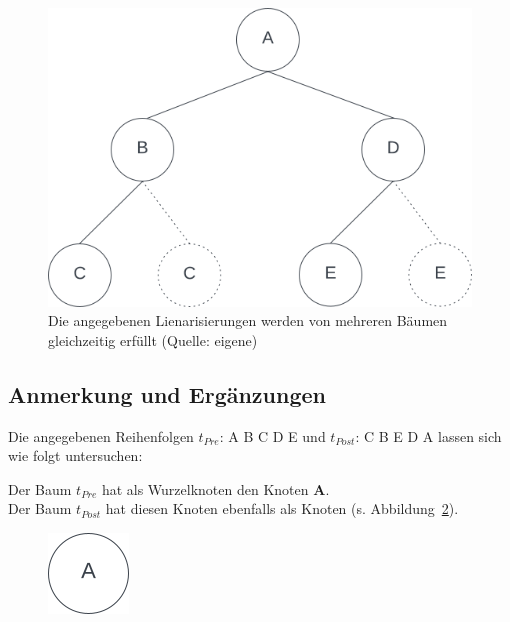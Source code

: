 \begin{figure}
    \begin{center}
        \includegraphics[scale=0.5]{chapters/5. Binäre Bäume/img/preproreconstruction}
        \caption{Die angegebenen Lienarisierungen werden von mehreren Bäumen gleichzeitig erfüllt (Quelle: eigene)}
        \label{fig:preproreconstruction}
    \end{center}
\end{figure}


\subsection{Anmerkung und Ergänzungen}

Die angegebenen Reihenfolgen $t_{Pre}$: A B C D E und $t_{Post}$: C B E D A lassen sich wie folgt untersuchen:

Der Baum $t_{Pre}$ hat als Wurzelknoten den Knoten \textbf{A}.\\
Der Baum $t_{Post}$ hat diesen Knoten ebenfalls als Knoten (s. Abbildung~\ref{fig:tree_a}).

\begin{figure}
    \begin{center}
        \includegraphics[scale=0.5]{chapters/5. Binäre Bäume/img/a}
        \caption{}
        \label{fig:tree_a}
    \end{center}
\end{figure}

